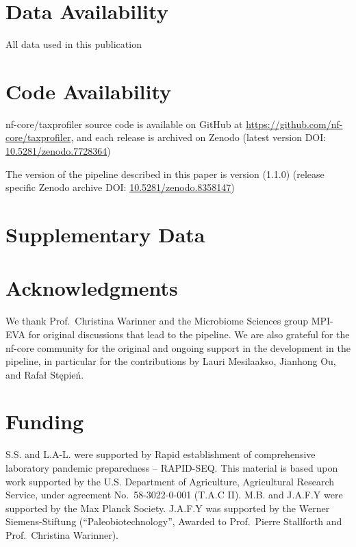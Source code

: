 \documentclass[
]{article}
\begin{document}
\hypertarget{data-availability}{%
\section{Data Availability}\label{data-availability}}

All data used in this publication

\hypertarget{code-availability}{%
\section{Code Availability}\label{code-availability}}

nf-core/taxprofiler source code is available on GitHub at
\url{https://github.com/nf-core/taxprofiler}, and each release is
archived on Zenodo (latest version DOI:
\href{https://doi.org/10.5281/zenodo.7728364}{10.5281/zenodo.7728364})

The version of the pipeline described in this paper is version (1.1.0)
(release specific Zenodo archive DOI:
\href{https://doi.org/10.5281/zenodo.8358147}{10.5281/zenodo.8358147})

\hypertarget{supplementary-data}{%
\section{Supplementary Data}\label{supplementary-data}}

\hypertarget{acknowledgments}{%
\section{Acknowledgments}\label{acknowledgments}}

We thank Prof.~Christina Warinner and the Microbiome Sciences group
MPI-EVA for original discussions that lead to the pipeline. We are also
grateful for the nf-core community for the original and ongoing support
in the development in the pipeline, in particular for the contributions
by Lauri Mesilaakso, Jianhong Ou, and Rafał Stępień.

\hypertarget{funding}{%
\section{Funding}\label{funding}}

S.S. and L.A-L. were supported by Rapid establishment of comprehensive
laboratory pandemic preparedness -- RAPID-SEQ. This material is based
upon work supported by the U.S. Department of Agriculture, Agricultural
Research Service, under agreement No.~58-3022-0-001 (T.A.C II). M.B. and
J.A.F.Y were supported by the Max Planck Society. J.A.F.Y was supported
by the Werner Siemens-Stiftung (``Paleobiotechnology'', Awarded to
Prof.~Pierre Stallforth and Prof.~Christina Warinner).
\end{document}
